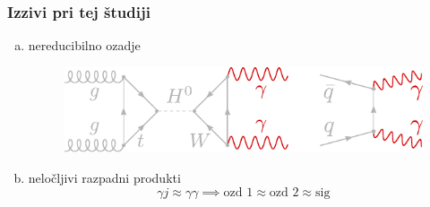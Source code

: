 \documentclass[14pt, t]{beamer}
\begin{document}
\begin{frame}
    \frametitle{Izzivi pri tej študiji}

    \begin{enumerate}[(a)]
    
        \item<1-> nereducibilno ozadje 
        \begin{figure}[htb!]
            \centering
            \includegraphics[width=\linewidth]{vector/figures-presentation/feynman-irr-bg.pdf}
        \end{figure}
        \vspace{2mm}

        \item<2-> neločljivi razpadni produkti
        \begin{equation*}
            \gamma j \approx \gamma \gamma \implies \text{ozd 1} \approx \text{ozd 2} \approx \text{sig}
        \end{equation*}
    \end{enumerate}

    \vspace{7mm}

    \vspace{-2mm}
    
\end{frame}
\end{document}
